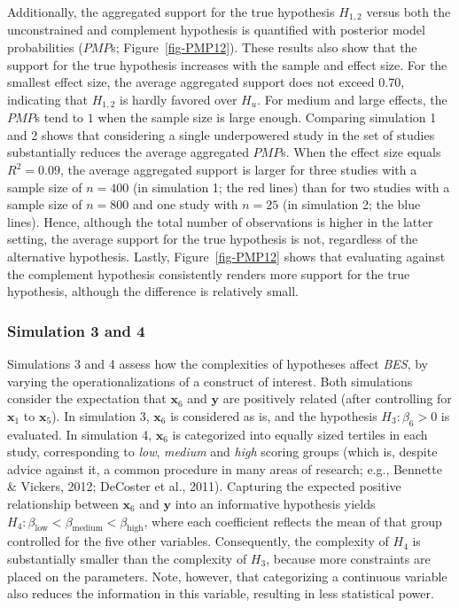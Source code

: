 \documentclass[
]{interact}
\begin{document}
Additionally, the aggregated support for the true hypothesis \(H_{1,2}\)
versus both the unconstrained and complement hypothesis is quantified
with posterior model probabilities (\(PMP\)s; Figure~\ref{fig-PMP12}).
These results also show that the support for the true hypothesis
increases with the sample and effect size. For the smallest effect size,
the average aggregated support does not exceed \(0.70\), indicating that
\(H_{1,2}\) is hardly favored over \(H_u\). For medium and large
effects, the \(PMP\)s tend to \(1\) when the sample size is large
enough. Comparing simulation 1 and 2 shows that considering a single
underpowered study in the set of studies substantially reduces the
average aggregated \(PMP\)s. When the effect size equals \(R^2 = 0.09\),
the average aggregated support is larger for three studies with a sample
size of \(n = 400\) (in simulation 1; the red lines) than for two
studies with a sample size of \(n = 800\) and one study with \(n = 25\)
(in simulation 2; the blue lines). Hence, although the total number of
observations is higher in the latter setting, the average support for
the true hypothesis is not, regardless of the alternative hypothesis.
Lastly, Figure~\ref{fig-PMP12} shows that evaluating against the
complement hypothesis consistently renders more support for the true
hypothesis, although the difference is relatively small.

\hypertarget{simulation-3-and-4}{%
\subsubsection{Simulation 3 and 4}\label{simulation-3-and-4}}

Simulations 3 and 4 assess how the complexities of hypotheses affect
\emph{BES}, by varying the operationalizations of a construct of
interest. Both simulations consider the expectation that
\(\boldsymbol{x}_6\) and \(\boldsymbol{y}\) are positively related
(after controlling for \(\boldsymbol{x}_1\) to \(\boldsymbol{x}_5\)). In
simulation 3, \(\boldsymbol{x}_6\) is considered as is, and the
hypothesis \(H_3: \beta_6 > 0\) is evaluated. In simulation 4,
\(\boldsymbol{x}_6\) is categorized into equally sized tertiles in each
study, corresponding to \emph{low}, \emph{medium} and \emph{high}
scoring groups (which is, despite advice against it, a common procedure
in many areas of research; e.g., Bennette \& Vickers, 2012; DeCoster et
al., 2011). Capturing the expected positive relationship between
\(\boldsymbol{x}_6\) and \(\boldsymbol{y}\) into an informative
hypothesis yields
\(H_4: \beta_{\text{low}} < \beta_{\text{medium}} < \beta_{\text{high}}\),
where each coefficient reflects the mean of that group controlled for
the five other variables. Consequently, the complexity of \(H_4\) is
substantially smaller than the complexity of \(H_3\), because more
constraints are placed on the parameters. Note, however, that
categorizing a continuous variable also reduces the information in this
variable, resulting in less statistical power.
\end{document}

